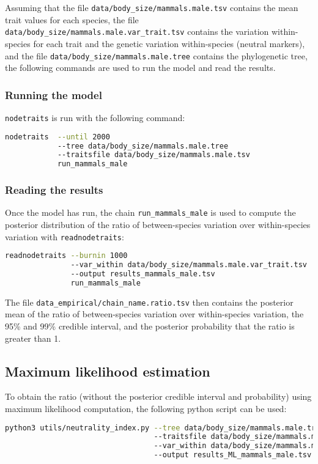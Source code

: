 \documentclass{article}
\begin{document}
Assuming that the file \texttt{data/body\_size/mammals.male.tsv} contains the mean trait values for each species, the file \texttt{data/body\_size/mammals.male.var\_trait.tsv} contains the variation within-species for each trait and the genetic variation within-species (neutral markers), and the file \texttt{data/body\_size/mammals.male.tree} contains the phylogenetic tree, the following commands are used to run the model and read the results.

\subsubsection{Running the model}\label{subsubsec:running-nodetraits}
\texttt{nodetraits} is run with the following command:
\begin{lstlisting}[language = sh,label={lst:nodetraits-run}]
nodetraits  --until 2000
            --tree data/body_size/mammals.male.tree
            --traitsfile data/body_size/mammals.male.tsv
            run_mammals_male
\end{lstlisting}

\subsubsection{Reading the results}\label{subsubsec:reading-the-results}
Once the model has run, the chain \texttt{run\_mammals\_male} is used to compute the posterior distribution of the ratio of between-species variation over within-species variation with \texttt{readnodetraits}:
\begin{lstlisting}[language = sh,label={lst:readnodetraits-rho}]
readnodetraits --burnin 1000
               --var_within data/body_size/mammals.male.var_trait.tsv
               --output results_mammals_male.tsv
               run_mammals_male
\end{lstlisting}
The file \texttt{data\_empirical/chain\_name.ratio.tsv} then contains the posterior mean of the ratio of between-species variation over within-species variation, the 95\% and 99\% credible interval, and the posterior probability that the ratio is greater than 1.

\subsection{Maximum likelihood estimation}\label{subsec:maximum-likelihood-estimation}

To obtain the ratio (without the posterior credible interval and probability) using maximum likelihood computation, the following python script can be used:
\begin{lstlisting}[language = sh, label={lst:neutrality_index}]
python3 utils/neutrality_index.py --tree data/body_size/mammals.male.tree
                                  --traitsfile data/body_size/mammals.male.tsv
                                  --var_within data/body_size/mammals.male.var_trait.tsv
                                  --output results_ML_mammals_male.tsv
\end{lstlisting}
\end{document}

